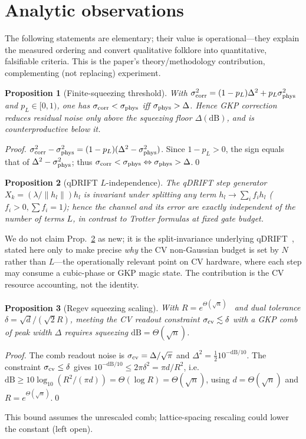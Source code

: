 \documentclass[12pt]{iopart}
\newtheorem{proposition}{Proposition}
\begin{document}
\section{Analytic observations}
The following statements are elementary; their value is operational---they
explain the measured ordering and convert qualitative folklore into
quantitative, falsifiable criteria. This is the paper's theory/methodology
contribution, complementing (not replacing) experiment.
\begin{proposition}[Finite-squeezing threshold]\label{prop:floor}
With $\sigma_{\rm corr}^2=(1-p_L)\Delta^2+p_L\sigma_{\rm phys}^2$ and
$p_L\in[0,1)$, one has $\sigma_{\rm corr}<\sigma_{\rm phys}$ iff
$\sigma_{\rm phys}>\Delta$. Hence GKP correction reduces residual noise only
above the squeezing floor $\Delta(\mathrm{dB})$, and is counterproductive
below it.
\end{proposition}
\begin{proof}
$\sigma_{\rm corr}^2-\sigma_{\rm phys}^2=(1-p_L)(\Delta^2-\sigma_{\rm phys}^2)$.
Since $1-p_L>0$, the sign equals that of $\Delta^2-\sigma_{\rm phys}^2$;
thus $\sigma_{\rm corr}<\sigma_{\rm phys}\Leftrightarrow\sigma_{\rm phys}
>\Delta$.\qed
\end{proof}
\begin{proposition}[qDRIFT $L$-independence]\label{prop:qdrift}
The qDRIFT step generator $X_k=(\lambda/\| h_l\|)h_l$ is invariant
under splitting any term $h_l\to\sum_i f_i h_l$ ($f_i>0,\sum f_i=1$); hence the
channel and its error are exactly independent of the number of terms $L$, in
contrast to Trotter formulas at fixed gate budget.
\end{proposition}
We do not claim Prop.~\ref{prop:qdrift} as new; it is the split-invariance
underlying qDRIFT~\cite{Campbell2019,Chen2021}, stated here only to make
precise \emph{why} the CV non-Gaussian budget is set by $N$ rather than
$L$---the operationally relevant point on CV hardware, where each step may
consume a cubic-phase or GKP magic state. The contribution is the CV resource accounting, not the identity.
\begin{proposition}[Regev squeezing scaling]\label{prop:regev}
With $R=e^{\Theta(\sqrt{n})}$~\cite{Regev2023} and dual tolerance
$\delta=\sqrt{d}/(\sqrt2 R)$, meeting the CV readout constraint
$\sigma_{\rm cv}\lesssim\delta$ with a GKP
comb of peak width $\Delta$ requires squeezing $\mathrm{dB}=\Theta(\sqrt{n})$.
\end{proposition}
\begin{proof}
The comb readout noise is $\sigma_{\rm cv}=\Delta/\sqrt\pi$ and
$\Delta^2=\frac12 10^{-\mathrm{dB}/10}$. The constraint
$\sigma_{\rm cv}\le\delta$ gives
$10^{-\mathrm{dB}/10}\le 2\pi\delta^2=\pi d/R^2$, i.e.
$\mathrm{dB}\ge 10\log_{10}(R^2/(\pi d))=\Theta(\log R)=\Theta(\sqrt n)$,
using $d=\Theta(\sqrt n)$ and $R=e^{\Theta(\sqrt n)}$.\qed
\end{proof}
This bound assumes the unrescaled comb; lattice-spacing rescaling could lower
the constant (left open).
\end{document}
